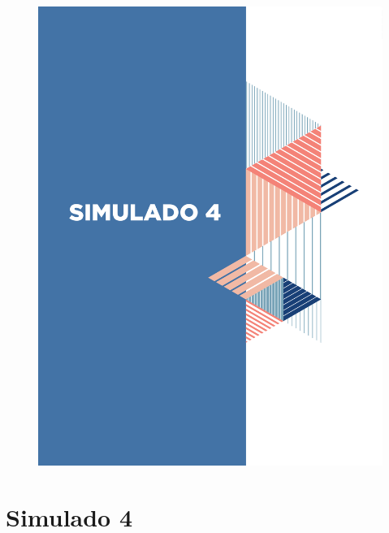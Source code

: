 

\pagebreak

\mbox{}

\begin{figure}
\vspace*{-3cm}
\hspace*{-3.7cm}\includegraphics[scale=1]{../watermarks/4simulado9ano.pdf}
\end{figure}


\pagebreak

\section*{Simulado 4}

